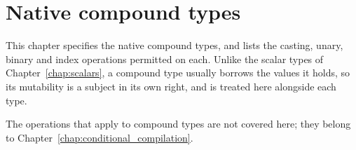 \chapter{Native compound types}
\label{chap:compound}

This chapter specifies the native compound types, and lists the casting, unary,
binary and index operations permitted on each. Unlike the scalar types of
Chapter~\ref{chap:scalars}, a compound type usually borrows the values it holds,
so its mutability is a subject in its own right, and is treated here alongside
each type.

The  operations that apply to compound types are not covered here;
they belong to Chapter~\ref{chap:conditional_compilation}.

\minitoc%








